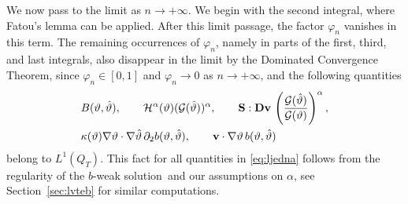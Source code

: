 \documentclass[11pt, a4paper, reqno]{amsart}
\numberwithin{equation}{section}
\newcommand{\thetah}{\hat\thet}
\newcommand{\vc}[1]{{\bf #1}}
\newcommand{\vv}{\vc{v}}
\newcommand{\thet}{\vartheta}
\renewcommand{\S}{\mathbf{S}}
\newcommand{\D}{\mathbf{D}}
\newcommand{\G}{\mathcal{G}}
\newcommand{\al}{\alpha}
\newcommand{\QT}{Q_T}
\newcommand{\bb}{b}
\newcommand{\B}{B}
\newcommand{\bws}{$\bb$-weak solution}
\begin{document}
We now pass to the limit as $n \to +\infty$. We begin with the second integral, where Fatou's lemma can be applied. After this limit passage, the factor $\varphi_n$ vanishes in this term. The remaining occurrences of $\varphi_n$, namely in parts of the first, third, and last integrals, also disappear in the limit by the Dominated Convergence Theorem, since $\varphi_n \in [0,1]$ and $\varphi_n \to 0$ as $n \to +\infty$, and the following quantities 
\begin{equation}
\begin{aligned}\label{eq:ljedna}
  &\B(\thet, \thetah), \qquad \mathcal{H}^\al(\thet)(\G(\thetah))^{\al},\qquad \S:\D{\vv}\,  \left(\frac{\G(\thetah)}{\G(\thet)}\right)^{\al},\\
  &\kappa(\thet)\nabla\thet\cdot\nabla\thetah \,\partial_2 \bb(\thet, \thetah),\qquad \vv\cdot\nabla \thet \, b(\thet, \thetah)
\end{aligned}
\end{equation}
belong to $L^1(\QT)$.
This  fact for all quantities in \eqref{eq:ljedna} follows from the regularity of the \bws\ and our assumptions on $\alpha$,
see Section~\ref{sec:lvteb} for similar computations.
\end{document}
